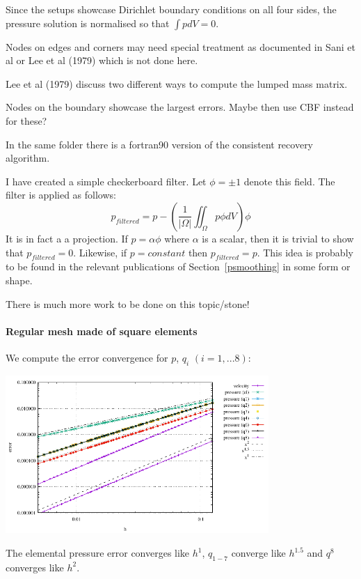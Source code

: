 Since the setups showcase Dirichlet boundary conditions on all four sides, 
the pressure solution is normalised so that $\int p dV =0 $.

\begin{remark}
Nodes on edges and corners may need special treatment as documented in Sani et al \cite{sagl81a} or
Lee et al (1979) \cite{legs79} which is not done here.  
\end{remark}

\begin{remark}
Lee et al (1979) \cite{legs79} discuss two different ways to compute the lumped mass matrix. 
\end{remark}

\begin{remark}
Nodes on the boundary showcase the largest errors. Maybe then use CBF instead for these?
\end{remark}

\begin{remark}
In the same folder there is a fortran90 version of the consistent recovery algorithm.
\end{remark}


I have created a simple checkerboard filter. Let $\phi=\pm 1$ denote this field.
The filter is applied as follows:
\[
p_{filtered} = p - \left( \frac{1}{|\Omega|} \iint_\Omega p \phi dV \right) \phi
\]
It is in fact a a projection. If $p=\alpha \phi$  where $\alpha$ is a scalar, then 
it is trivial to show that $p_{filtered} =0$.
Likewise, if $p=constant$ then $p_{filtered}=p$.
This idea is probably to be found in the relevant publications of Section~\ref{psmoothing}
in some form or shape. 

There is much more work to be done on this topic/stone!

\newpage
\paragraph{Regular mesh made of square elements}

We compute the error convergence for $p$, $q_i$ $(i=1,...8)$:
\begin{center}
\includegraphics[width=10cm]{python_codes/fieldstone_12/results/reg/errors}
\end{center}
The elemental pressure error converges like $h^1$, $q_{1-7}$ converge like $h^{1.5}$ and 
$q^8$ converges like $h^2$.


